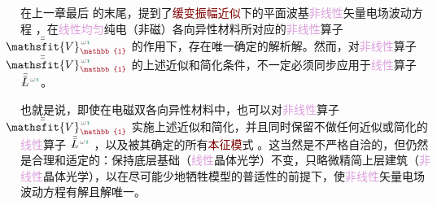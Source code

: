 在上一章最后  的末尾，提到了\textcolor{Maroon}{缓变振幅近似}下的\textcolor{PineGreen}{平面波基}\textcolor{Plum}{非线性}矢量电场波动方程 ，在\textcolor{Plum}{线性}\textcolor{Plum}{均匀}\textcolor{PineGreen}{纯电（非磁）各向异性}材料所对应的\textcolor{Plum}{非线性}算子 $\Xint{\mathcolor{gray}{-}}{25}{\bar{\bar{\mathsfit{V}}}}^{\;\! \mathcolor{gray}{\omega} \textcolor{PineGreen}{\imath}}_{\textcolor{Maroon}{\mathbb{1}}}$ 的作用下，存在唯一确定的解析解。然而，对\textcolor{Plum}{非线性}算子 $\Xint{\mathcolor{gray}{-}}{25}{\bar{\bar{\mathsfit{V}}}}^{\;\! \mathcolor{gray}{\omega} \textcolor{PineGreen}{\imath}}_{\textcolor{Maroon}{\mathbb{1}}}$ 的上述近似和简化条件，不一定必须同步应用于\textcolor{Plum}{线性}算子 $\Xint{\mathcolor{gray}{-}}{30}{\bar{\bar{L}}}^{\;\! \mathcolor{gray}{\omega} \textcolor{PineGreen}{\imath}}$。

也就是说，即使在电磁\textcolor{PineGreen}{双各向异性}材料中，也可以对\textcolor{Plum}{非线性}算子 $\Xint{\mathcolor{gray}{-}}{25}{\bar{\bar{\mathsfit{V}}}}^{\;\! \mathcolor{gray}{\omega} \textcolor{PineGreen}{\imath}}_{\textcolor{Maroon}{\mathbb{1}}}$  实施上述近似和简化，并且同时保留不做任何近似或简化的\textcolor{Plum}{线性}算子 $\Xint{\mathcolor{gray}{-}}{30}{\bar{\bar{L}}}^{\;\! \mathcolor{gray}{\omega} \textcolor{PineGreen}{\imath}}$ ，以及被其确定的所有\textcolor{Maroon}{本征模}式 。这当然是不严格自洽的，但仍然是合理和适定的：保持底层基础（\textcolor{Plum}{线性}\textcolor{PineGreen}{晶体光学}）不变，只略微精简上层建筑（\textcolor{Plum}{非线性}\textcolor{PineGreen}{晶体光学}），以在尽可能少地牺牲模型的普适性的前提下，使\textcolor{Plum}{非线性}矢量电场波动方程有解且解唯一。

